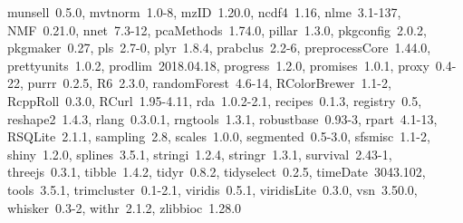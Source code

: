 \documentclass[12pt]{article}\usepackage[]{graphicx}\usepackage[]{color}
\begin{document}
\begin{appendices}
\begin{itemize}
    munsell~0.5.0, mvtnorm~1.0-8, mzID~1.20.0, ncdf4~1.16,
    nlme~3.1-137, NMF~0.21.0, nnet~7.3-12, pcaMethods~1.74.0,
    pillar~1.3.0, pkgconfig~2.0.2, pkgmaker~0.27, pls~2.7-0,
    plyr~1.8.4, prabclus~2.2-6, preprocessCore~1.44.0,
    prettyunits~1.0.2, prodlim~2018.04.18, progress~1.2.0,
    promises~1.0.1, proxy~0.4-22, purrr~0.2.5, R6~2.3.0,
    randomForest~4.6-14, RColorBrewer~1.1-2, RcppRoll~0.3.0,
    RCurl~1.95-4.11, rda~1.0.2-2.1, recipes~0.1.3, registry~0.5,
    reshape2~1.4.3, rlang~0.3.0.1, rngtools~1.3.1,
    robustbase~0.93-3, rpart~4.1-13, RSQLite~2.1.1, sampling~2.8,
    scales~1.0.0, segmented~0.5-3.0, sfsmisc~1.1-2, shiny~1.2.0,
    splines~3.5.1, stringi~1.2.4, stringr~1.3.1, survival~2.43-1,
    threejs~0.3.1, tibble~1.4.2, tidyr~0.8.2, tidyselect~0.2.5,
    timeDate~3043.102, tools~3.5.1, trimcluster~0.1-2.1,
    viridis~0.5.1, viridisLite~0.3.0, vsn~3.50.0, whisker~0.3-2,
    withr~2.1.2, zlibbioc~1.28.0
\end{itemize}


\end{appendices}



\end{document}
